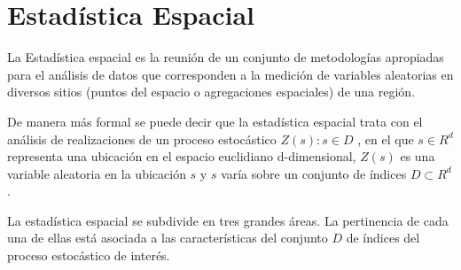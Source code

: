


\section{Estadística Espacial}

La Estadística espacial es la reunión de un conjunto de metodologías apropiadas para el
análisis de datos que corresponden a la medición de variables aleatorias en diversos sitios
(puntos del espacio o agregaciones espaciales) de una región. 

De manera más formal se puede decir que la estadística espacial trata con el análisis de 
realizaciones de un proceso estocástico ${ Z ( s ) : s \in D }$ , en el que $s \in R^d$ representa 
una ubicación en el espacio euclidiano d-dimensional, $Z(s)$ es una variable aleatoria en
la ubicación $s$ y $s$ varía sobre un conjunto de índices $D \subset R^d$. \cite{giraldo}

La estadística espacial se subdivide en tres grandes áreas. La pertinencia de cada una
de ellas está asociada a las características del conjunto $D$ de índices del proceso estocástico
de interés. \cite{giraldo}

  
